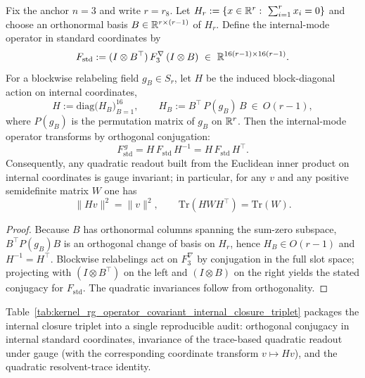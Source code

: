 \begin{proposition}\label{prop:internal_standard_rep_gauge_invariant_readouts}
\MathTag Fix the anchor $n=3$ and write $r=r_8$.
Let $H_r:=\{x\in\mathbb{R}^r:\ \sum_{i=1}^r x_i=0\}$ and choose an orthonormal basis $B\in\mathbb{R}^{r\times(r-1)}$ of $H_r$.
Define the internal-mode operator in standard coordinates by
\[
F_{\mathrm{std}} := (I\otimes B^\top)\,F_3^\nabla\,(I\otimes B)\ \in\ \mathbb{R}^{16(r-1)\times 16(r-1)}.
\]
For a blockwise relabeling field $g_B\in S_r$, let $H$ be the induced block-diagonal action on internal coordinates,
\[
H := \mathrm{diag}\bigl(H_B\bigr)_{B=1}^{16},
\qquad
H_B := B^\top\,P(g_B)\,B\ \in\ O(r-1),
\]
where $P(g_B)$ is the permutation matrix of $g_B$ on $\mathbb{R}^r$.
Then the internal-mode operator transforms by orthogonal conjugation:
\[
F_{\mathrm{std}}^{\,g} = H\,F_{\mathrm{std}}\,H^{-1}=H\,F_{\mathrm{std}}\,H^\top.
\]
Consequently, any quadratic readout built from the Euclidean inner product on internal coordinates is gauge invariant; in particular, for any $v$ and any positive semidefinite matrix $W$ one has
\[
\|H v\|^2=\|v\|^2,
\qquad
\mathrm{Tr}(HWH^\top)=\mathrm{Tr}(W).
\]
\end{proposition}
\begin{proof}
Because $B$ has orthonormal columns spanning the sum-zero subspace, $B^\top P(g_B) B$ is an orthogonal change of basis on $H_r$, hence $H_B\in O(r-1)$ and $H^{-1}=H^\top$.
Blockwise relabelings act on $F_3^\nabla$ by conjugation in the full slot space; projecting with $(I\otimes B^\top)$ on the left and $(I\otimes B)$ on the right yields the stated conjugacy for $F_{\mathrm{std}}$.
The quadratic invariances follow from orthogonality.
\end{proof}

\begin{remark}\label{rem:internal_closure_triplet_certificate}
\AuditTag Table~\ref{tab:kernel_rg_operator_covariant_internal_closure_triplet} packages the internal closure triplet into a single reproducible audit:
orthogonal conjugacy in internal standard coordinates, invariance of the trace-based quadratic readout under gauge (with the corresponding coordinate transform $v\mapsto Hv$), and the quadratic resolvent-trace identity.
\end{remark}

